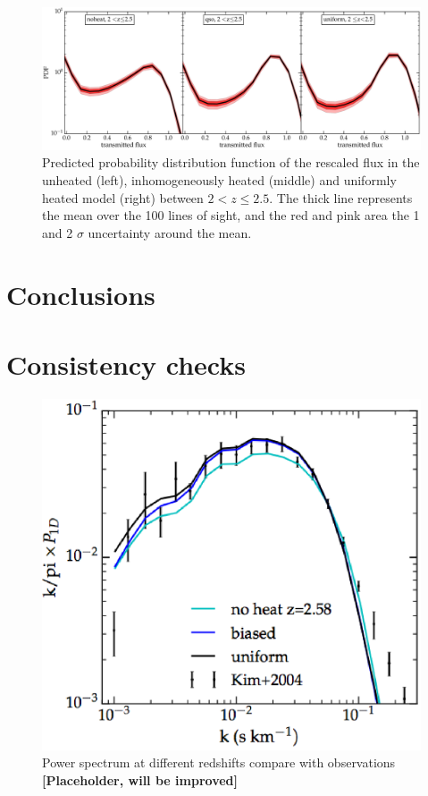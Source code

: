 \documentclass[numberedappendix]{emulateapj}
\newcommand\ALc[1]{{\color{red} \bf #1}} %
\begin{document}
\begin{figure}[h]
\centering
\includegraphics[width = .9\textwidth ]{PDF_predict_allz_100lines}
\caption{Predicted probability distribution function of the rescaled flux in the unheated (left), inhomogeneously heated (middle) and uniformly heated model (right) between $2 <z\leq 2.5$. The thick line represents the mean over the 100 lines of sight, and the red and pink area the 1 and 2 $\sigma$ uncertainty around the mean.  }
\label{fig:PDF_predict}
\end{figure}


\section{Conclusions}\label{sec:conclusion}
\appendix
\section{Consistency checks}

\begin{figure}[h]
\centering
\includegraphics[width = .45\textwidth ]{powerspec}
\caption{ Power spectrum at different redshifts compare with observations \ALc{[Placeholder, will be improved]}}
\label{fig:powespec}
\end{figure}
\end{document}
